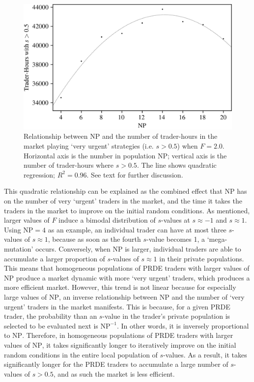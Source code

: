 \documentclass[conference]{IEEEtran}
\begin{document}
\begin{figure}[htbp]
    \centerline{\includegraphics[width=\columnwidth]{f=2.0_strats.png}}
    \caption{
        Relationship between $\mathrm{NP}$ and the number of trader-hours in the market playing `very urgent' strategies (i.e. $s>0.5$) when $F=2.0$.
        Horizontal axis is the number in population $\mathrm{NP}$; vertical axis is the number of trader-hours where $s>0.5$.
        The line shows quadratic regression; $R^2=0.96$.
        See text for further discussion.
    }
    \label{F=2.0_strats}
\end{figure}

This quadratic relationship can be explained as the combined effect that $\mathrm{NP}$ has on the number of very `urgent' traders in the market, and the time it takes the traders in the market to improve on the initial random conditions.
As mentioned, larger values of $F$ induce a bimodal distribution of $s$-values at $s\approx -1$ and $s\approx 1$.
Using $\mathrm{NP}=\mathrm{4}$ as an example, an individual trader can have at most three $s$-values of $s\approx 1$, because as soon as the fourth $s$-value becomes 1, a `mega-mutation' occurs.
Conversely, when $\mathrm{NP}$ is larger, individual traders are able to accumulate a larger proportion of $s$-values of $s\approx 1$ in their private populations.
This means that homogeneous populations of PRDE traders with larger values of $\mathrm{NP}$ produce a market dynamic with more `very urgent' traders, which produces a more efficient market.
However, this trend is not linear because for especially large values of $\mathrm{NP}$, an inverse relationship between $\mathrm{NP}$ and the number of `very urgent' traders in the market manifests.
This is because, for a given PRDE trader, the probability than an $s$-value in the trader's private population is selected to be evaluated next is $\mathrm{NP}^{-1}$.
In other words, it is inversely proportional to $\mathrm{NP}$.
Therefore, in homogeneous populations of PRDE traders with larger values of $\mathrm{NP}$, it takes significantly longer to iteratively improve on the initial random conditions in the entire local population of $s$-values.
As a result, it takes significantly longer for the PRDE traders to accumulate a large number of $s$-values of $s>0.5$, and as such the market is less efficient.
\end{document}
